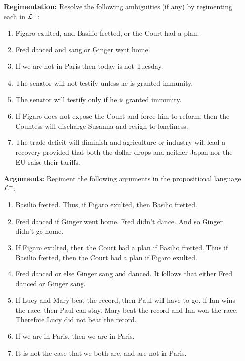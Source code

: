 \documentclass[a4paper, 11pt]{article} %
\begin{document}
\begin{enumerate}[leftmargin=1.2in,itemsep=2pt]\small
	\item[\bf Regimentation:] Resolve the following ambiguities (if any) by regimenting each in $\mathcal{L}^+$:
    \begin{enumerate}[label=\arabic*.]\small
      \item Figaro exulted, and Basilio fretted, or the Court had a plan.
      \item Fred danced and sang or Ginger went home.
      \item If we are not in Paris then today is not Tuesday.
      \item The senator will not testify unless he is granted immunity.
      \item The senator will testify only if he is granted immunity.
      \item If Figaro does not expose the Count and force him to reform, then the Countess will discharge Susanna and resign to loneliness.
      \item The trade deficit will diminish and agriculture or industry will lead a recovery provided that both the dollar drops and neither Japan nor the EU raise their tariffs.
    \end{enumerate}
	\item[\bf Arguments:] Regiment the following arguments in the propositional language $\mathcal{L}^+$:
    \begin{enumerate}[label=\arabic*.]\small
      \item Basilio fretted. Thus, if Figaro exulted, then Basilio fretted.
      \item Fred danced if Ginger went home. Fred didn't dance. And so Ginger didn't go home.
      \item If Figaro exulted, then the Court had a plan if Basilio fretted. Thus if Basilio fretted, then the Court had a plan if Figaro exulted.
      \item Fred danced or else Ginger sang and danced. It follows that either Fred danced or Ginger sang.
      \item If Lucy and Mary beat the record, then Paul will have to go. If Ian wins the race, then Paul can stay. Mary beat the record and Ian won the race. Therefore Lucy did not beat the record.
      \item If we are in Paris, then we are in Paris.
      \item It is not the case that we both are, and are not in Paris.

\end{enumerate}
\end{enumerate}
\end{document}
